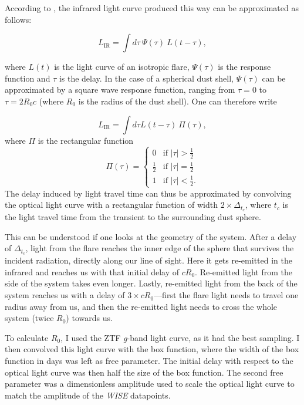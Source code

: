 According to \cite{Velzen2016}, the infrared light curve produced this way can be approximated as follows:

\begin{equation}
    L_\text{IR} = \int d\tau~ \Psi(\tau) ~L(t-\tau),
\end{equation}

where $L(t)$ is the light curve of an isotropic flare,  $\Psi(\tau)$ is the response function and $\tau$ is the delay. In the case of a spherical dust shell, $\Psi(\tau)$ can be approximated by a square wave response function, ranging from $\tau=0$ to $\tau = 2 R_0 c$ (where $R_0$ is the radius of the dust shell). One can therefore write

\begin{equation}
    L_\text{IR} = \int d\tau L (t-\tau) ~\Pi (\tau),
\end{equation}
where $\Pi$ is the rectangular function
\begin{equation}
    \Pi(\tau) = \begin{cases}
        0           & \text{if $|\tau|>\frac{1}{2}$}   \\
        \frac{1}{2} & \text{if $|\tau| = \frac{1}{2}$} \\
        1           & \text{if $|\tau|<\frac{1}{2}$}.
    \end{cases}
\end{equation}
The delay induced by light travel time can thus be approximated by convolving the optical light curve with a rectangular function of width $2\times\Delta_{t_c}$, where $t_c$ is the light travel time from the transient to the surrounding dust sphere.

This can be understood if one looks at the geometry of the system. After a delay of $\Delta_{t_c}$, light from the flare reaches the inner edge of the sphere that survives the incident radiation, directly along our line of sight. Here it gets re-emitted in the infrared and reaches us with that initial delay of $cR_0$. Re-emitted light from the side of the system takes even longer. Lastly, re-emitted light from the back of the system reaches us with a delay of $3\times cR_0$---first the flare light needs to travel one radius away from us, and then the re-emitted light needs to cross the whole system (twice $R_0$) towards us.

To calculate $R_0$, I used the ZTF \textit{g}-band light curve, as it had the best sampling. I then convolved this light curve with the box function, where the width of the box function in days was left as free parameter. The initial delay with respect to the optical light curve was then half the size of the box function. The second free parameter was a dimensionless amplitude used to scale the optical light curve to match the amplitude of the \textit{WISE} datapoints.

